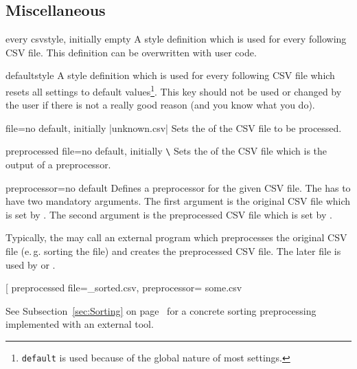 \documentclass[a4paper,11pt]{ltxdoc}
\begin{document}
\clearpage
\subsection{Miscellaneous}%

\begin{docCsvKey}{every csv}{}{style, initially empty}
  A style definition which is used for every following CSV file.
  This definition can be overwritten with user code.
\begin{dispListing}
\end{dispListing}
\end{docCsvKey}

\begin{docCsvKey}{default}{}{style}
  A style definition which is used for every following CSV file which
  resets all settings to default values\footnote{\texttt{default} is used
  because of the global nature of most settings.}.
  This key should not be used or changed by the user if there is not a
  really good reason (and you know what you do).
\end{docCsvKey}


\begin{docCsvKey}{file}{=}{no default, initially |unknown.csv|}
  Sets the  of the CSV file to be processed.
\end{docCsvKey}


\begin{docCsvKey}{preprocessed file}{=}{no default, initially \texttt{\textbackslash{}}}
  Sets the  of the CSV file which is the output of a
  preprocessor.
\end{docCsvKey}


\begin{docCsvKey}{preprocessor}{=}{no default}
  Defines a preprocessor for the given CSV file.
  The  has to have two mandatory arguments. The first argument
  is the original CSV file which is set by .
  The second argument is the preprocessed CSV file
  which is set by .\par\smallskip
  Typically, the  may call an external program which preprocesses
  the original CSV file (e.\,g. sorting the file) and creates the
  preprocessed CSV file. The later file is used by 
  or .
\begin{dispListing}
\newcommand{\mySortTool}[2]{%
}

\csvreader[%
  preprocessed file=\jobname_sorted.csv,
  preprocessor=\mySortTool,
  ]{some.csv}{}{%
}
\end{dispListing}
See Subsection~\ref{sec:Sorting} on page~\pageref{sec:Sorting} for a
concrete sorting preprocessing implemented with an external tool.
\end{docCsvKey}
\end{document}

